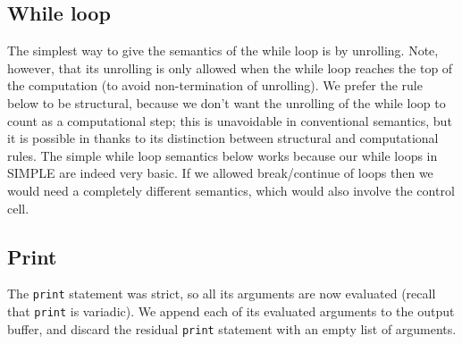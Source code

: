 \documentclass{article}
\begin{document}
\begin{kdefinition}
\begin{module}{}
\begin{kblock}[text]
 \subsection{While loop}
The simplest way to give the semantics of the while loop is by unrolling.
Note, however, that its unrolling is only allowed when the while loop reaches
the top of the computation (to avoid non-termination of unrolling).  We prefer
the rule below to be structural, because we don't want the unrolling of the
while loop to count as a computational step; this is unavoidable in
conventional semantics, but it is possible in \K thanks to its distinction
between structural and computational rules.  The simple while loop semantics
below works because our while loops in SIMPLE are indeed very basic.  If we
allowed break/continue of loops then we would need a completely different
semantics, which would also involve the \textsf{control} cell. \end{kblock}
\begin{kblock}[text]
 \subsection{Print}
The \texttt{print} statement was strict, so all its arguments are now
evaluated (recall that \texttt{print} is variadic).  We append each of
its evaluated arguments to the output buffer, and discard the residual
\texttt{print} statement with an empty list of arguments. \end{kblock}
\begin{kblock}[text]

\end{kblock}
\end{module}
\end{kdefinition}
\end{document}
